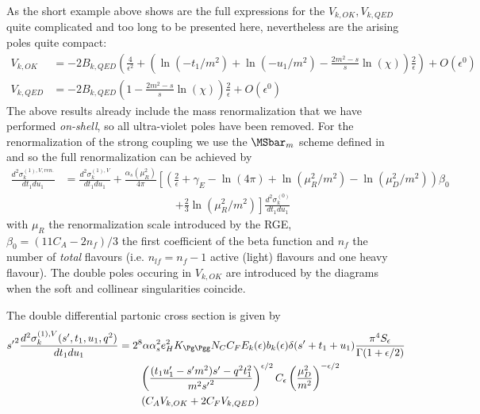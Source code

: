 As the short example above shows are the full expressions for the $V_{k,OK},V_{k,QED}$ quite complicated and too long to be presented here, nevertheless are the arising poles quite compact:
\begin{align}
V_{k,OK} &= -2B_{k,QED}\left(\frac 4 {\epsilon^2} + \left(\ln(-t_1/m^2) + \ln(-u_1/m^2) -\frac{2m^2-s}{s}\ln(\chi)\right)\frac 2 \epsilon \right) + O(\epsilon^0)\\
V_{k,QED} &= -2B_{k,QED}\left(1-\frac{2m^2-s}{s}\ln(\chi)\right)\frac 2 \epsilon + O(\epsilon^0)
\end{align}
The above results already include the mass renormalization that we have performed \textit{on-shell}, so all ultra-violet poles have been removed. For the renormalization of the strong coupling we use the $\MSbar_m$ scheme defined in \cite{Bojak:2000eu} and so the full renormalization can be achieved by
\begin{align}
\frac{d^2\sigma_{k}^{(1),V,ren.}}{dt_1du_1} &=\frac{d^2\sigma_{k}^{(1),V}}{dt_1du_1} + \frac{\alpha_s(\mu_R^2)}{4\pi}\left[\left(\frac 2 \epsilon + \gamma_E-\ln(4\pi)+\ln(\mu_R^2/m^2)-\ln(\mu_D^2/m^2)\right)\beta_0 \right.\nonumber\\
 &\hspace{120pt}\left.+\frac 2 3 \ln(\mu_R^2/m^2)\right]\frac{d^2\sigma_{k}^{(0)}}{dt_1du_1}
\end{align}
with $\mu_R$ the renormalization scale introduced by the RGE, $\beta_0 = (11C_A-2n_f)/3$ the first coefficient of the beta function and $n_f$ the number of \textit{total} flavours (i.e. $n_{lf}=n_f-1$ active (light) flavours and one heavy flavour). The double poles occuring in $V_{k,OK}$ are introduced by the diagrams  when the soft and collinear singularities coincide.

The double differential partonic cross section is given by
\begin{align}
{s'}^2\frac{d^2\sigma_{k}^{(1),V}(s',t_1,u_1,q^2)}{dt_1du_1} &= 2^8\alpha\alpha_s^2 e_H^2 K_{\Pg\Pgg}N_CC_F E_k(\epsilon) b_k(\epsilon)\delta(s'+t_1+u_1) \frac{\pi^4 S_\epsilon}{\Gamma(1+\epsilon/2)}  \nonumber\\
 &\hspace{20pt} \left(\frac{(t_1u_1'-s'm^2)s' - q^2t_1^2}{m^2{s'}^2}\right)^{\epsilon/2}C_\epsilon\left(\frac{\mu_D^2}{m^2}\right)^{-\epsilon/2} \nonumber\\
 &\hspace{20pt} \left( C_A V_{k,OK} + 2C_F V_{k,QED}\right)
\end{align}
